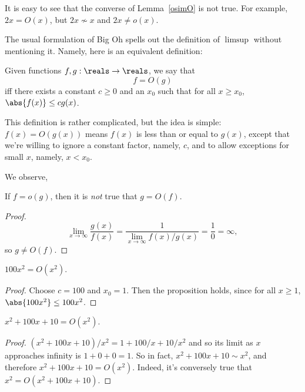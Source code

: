 It is easy to see that the converse of Lemma~\ref{osimO} is not true.  For
example, $2x = O(x)$, but $2x \not\sim x$ and $2x \neq o(x)$.

The usual formulation of Big Oh spells out the definition of $\limsup$
without mentioning it.  Namely, here is an equivalent definition:
\begin{definition}
Given functions $f, g : \reals \to \reals$, we say that
\[
f = O(g)
\]
iff there exists a constant $c \geq 0$ and an $x_0$ such that for all $x \geq
x_0$, $\abs{f(x)} \leq c g(x)$.
\end{definition}

This definition is rather complicated, but the idea is simple: $f(x) =
O(g(x))$ means $f(x)$ is less than or equal to $g(x)$, except that we're
willing to ignore a constant factor, namely, $c$, and to allow exceptions for
small $x$, namely, $x < x_0$.

We observe,
\begin{lemma}
If $f = o(g)$, then it is \emph{not} true that $g = O(f)$.
\end{lemma}
\begin{proof}
\[
\lim_{x \rightarrow \infty} \frac{g(x)}{f(x)} =
 \frac{1}{\lim_{x \rightarrow \infty} f(x)/g(x)} =
 \frac{1}{0} = \infty,
\]
so $g \neq O(f)$.

\end{proof}

\begin{proposition}
$100x^2 = O(x^2)$.
\end{proposition}

\begin{proof}
Choose $c = 100$ and $x_0 = 1$.  Then the proposition holds, since for all
$x \geq 1$, $\abs{100x^2} \leq 100 x^2$.
\end{proof}

\begin{proposition}\label{x2O}
$x^2 + 100x + 10 = O(x^2)$.
\end{proposition}

\begin{proof}
$(x^2 + 100x + 10)/x^2 = 1 + 100/x + 10/x^2$ and so its limit as $x$
approaches infinity is $1 + 0 + 0 = 1$.  So in fact, $x^2 + 100x + 10 \sim
x^2$, and therefore $x^2 + 100x + 10 = O(x^2)$.  Indeed, it's conversely
true that $x^2= O(x^2 + 100x + 10)$.
\end{proof}

